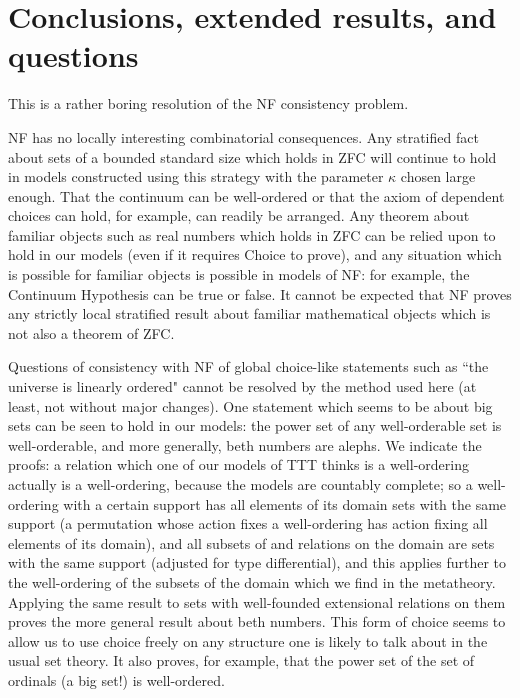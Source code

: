 \documentclass[112pt]{article}
\theoremstyle{definition}
\theoremstyle{remark}
\begin{document}
\newpage

\section{Conclusions, extended results, and questions}
\begin{comment}
[I have copied in the conclusions section of an older version, but what it says should be about right,
and may require some revisions to fit in this paper.  I also added the bibliography, which again is probably approximately the right one.]
\end{comment}

This is a rather boring resolution of the NF consistency problem.

NF has no locally interesting combinatorial consequences.   Any stratified fact about sets of a bounded standard size which holds in ZFC will continue to hold in models constructed using this strategy with the parameter $\kappa$ chosen large enough.
That the continuum can be well-ordered or that the axiom of dependent choices can hold, for example, can readily be arranged.  Any theorem about familiar objects such as real numbers which holds in ZFC can be relied upon to hold in our models
(even if it requires Choice to prove), and any situation which is possible for familiar objects is possible in models of NF:  for example, the Continuum Hypothesis can be true or false.  It cannot be expected that NF proves any strictly local stratified result about familiar mathematical objects which is not also a theorem of ZFC.

Questions of consistency with NF of global choice-like statements such as ``the universe is linearly ordered"  cannot be resolved by the method used here (at least, not without major changes).  One statement which seems to be about big sets can be seen to hold in our models:  the power set of any well-orderable set is well-orderable, and more generally, beth numbers are alephs.  We indicate the proofs:  a relation which one of our models of TTT thinks is a well-ordering actually is a well-ordering, because the models are countably complete;  so a well-ordering with a certain support has all elements of its domain sets with the same support (a permutation whose action fixes a well-ordering has action fixing all elements of its domain), and all subsets of and relations on the domain are sets with the same support (adjusted for type differential), and this applies further to the well-ordering of the subsets of the domain which we find in the metatheory.  Applying the same result to sets with well-founded extensional relations on them proves the more general result about beth numbers.  This form of choice seems to allow us to use choice freely on any structure one is likely to talk about in the usual set theory.  It also proves, for example, that the power set of the set of ordinals (a big set!) is well-ordered.
\end{document}
